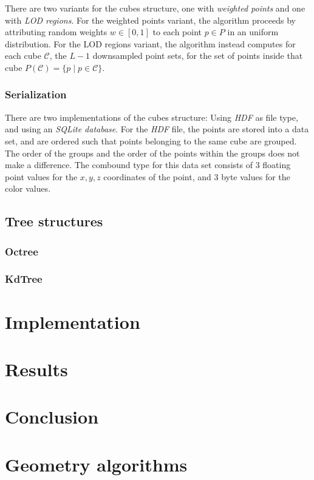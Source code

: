 \documentclass[a4paper,10pt,abstracton,notitlepage]{scrreprt}
\begin{document}
There are two variants for the cubes structure, one with \emph{weighted points} and one with \emph{LOD regions}. For the weighted points variant, the algorithm proceeds by attributing random weights $w \in [0,1]$ to each point $p \in P$ in an uniform distribution. For the LOD regions variant, the algorithm instead computes for each cube $\mathcal{C}$, the $L-1$ downsampled point sets, for the set of points inside that cube $P(\mathcal{C}) = \{ p \mid p \in \mathcal{C} \}$.

\subsection{Serialization}
There are two implementations of the cubes structure: Using \emph{HDF} as file type, and using an \emph{SQLite database}. For the \emph{HDF} file, the points are stored into a data set, and are ordered such that points belonging to the same cube are grouped. The order of the groups and the order of the points within the groups does not make a difference. The combound type for this data set consists of 3 floating point values for the $x, y, z$ coordinates of the point, and 3 byte values for the color values.

\section{Tree structures}
\subsection{Octree}
\subsection{KdTree}

\chapter{Implementation}

\chapter{Results}

\chapter{Conclusion}

\appendix
\chapter{Geometry algorithms}
\end{document}
